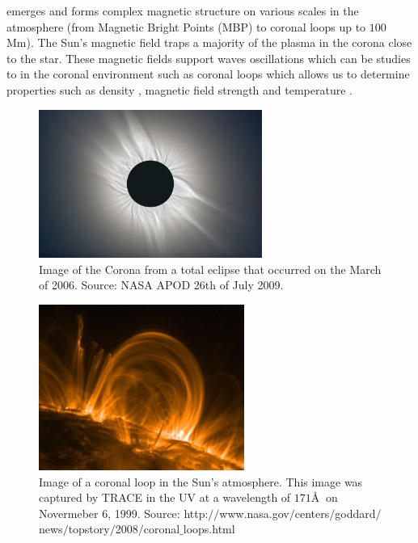 \documentclass[12pt,a4paper,twoside]{article}
\begin{document}
emerges and forms complex magnetic structure on various scales in the atmosphere (from Magnetic Bright Points (MBP) to coronal loops up to $100$ Mm). The Sun's magnetic field traps a majority of the plasma in the corona close to the star. These magnetic fields support waves oscillations which can be studies to in the coronal environment such as coronal loops which allows us to determine properties such as density \citep{Verwichte_2013A_A}, magnetic field strength \citep{Nakariakov_2001} and temperature \citep{De_Moortel_2003SoPh}.           
\begin{figure}
\centering
\includegraphics[width = 0.65\textwidth]{corona_vangorp}
\caption{Image of the Corona from a total eclipse that occurred on the March of 2006. Source: NASA APOD 26th of July 2009.}\label{fig_2}
\end{figure}
\begin{figure}
\centering
\includegraphics[width = 0.60\textwidth]{coronaloop_trace}
\caption{Image of a coronal loop in the Sun's atmosphere. This image was captured by TRACE in the UV at a wavelength of $171$\AA$ \ $ on Novermeber 6, 1999. Source: http:$//$www.nasa.gov$/$centers$/$goddard$/$news$/$topstory$/$2008$/$coronal$\_$loops.html}\label{fig_2a}
\end{figure}
\end{document}
